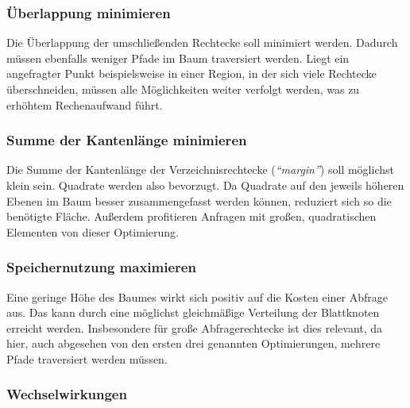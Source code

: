 \documentclass[runningheads,a4paper]{llncs}
\begin{document}

	\subsubsection{Überlappung minimieren} %
	\label{ssub:ueberlappung_minimieren}

	Die Überlappung der umschließenden Rechtecke soll minimiert werden. Dadurch müssen ebenfalls weniger Pfade im Baum traversiert werden. Liegt ein angefragter Punkt beispielsweise in einer Region, in der sich viele Rechtecke überschneiden, müssen alle Möglichkeiten weiter verfolgt werden, was zu erhöhtem Rechenaufwand führt.
	

	\subsubsection{Summe der Kantenlänge minimieren} %
	\label{ssub:kantenlaenge}

	Die Summe der Kantenlänge der Verzeichnisrechtecke (\emph{\enquote{margin}}) soll möglichst klein sein. Quadrate werden also bevorzugt. Da Quadrate auf den jeweils höheren Ebenen im Baum besser zusammengefasst werden können, reduziert sich so die benötigte Fläche.
	Außerdem profitieren Anfragen mit großen, quadratischen Elementen von dieser Optimierung. \citep[vgl.][323]{Beckmann:1990}
	

	\subsubsection{Speichernutzung maximieren} %
	\label{ssub:speichernutzung_maximieren}

	Eine geringe Höhe des Baumes wirkt sich positiv auf die Kosten einer Abfrage aus. Das kann durch eine möglichst gleichmäßige Verteilung der Blattknoten erreicht werden. Insbesondere für große Abfragerechtecke ist dies relevant, da hier, auch abgesehen von den ersten drei genannten Optimierungen, mehrere Pfade traversiert werden müssen. \citep[vgl.][323-324]{Beckmann:1990}
	

	\subsubsection{Wechselwirkungen} %
	\label{ssub:wechselwirkungen}
\end{document}
